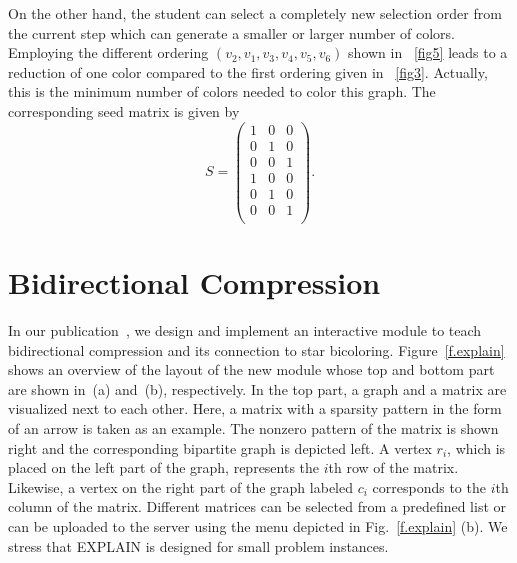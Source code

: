\documentclass[12pt, oneside]{book}
\begin{document}
On the other hand, the student can select a completely new selection order from the current step which can generate a smaller or larger number of colors. Employing the different ordering $(v_2,v_1,v_3,v_4,v_5,v_6)$ shown in \figurename~\ref{fig5} leads to a reduction of one color compared to the first ordering given in \figurename~\ref{fig3}. Actually, this is the minimum number of colors needed to color this graph. The corresponding seed matrix is given by
$$
S =
 \begin{pmatrix}
 1 & 0 & 0 \\
 0 & 1 & 0 \\
 0 & 0 & 1 \\
 1 & 0 & 0 \\
 0 & 1 & 0 \\
 0 & 0 & 1 \\
 \end{pmatrix}.
$$


\section{Bidirectional Compression}
\label{s.bidirectional}
In our publication~\cite{2014:09}, we design and implement an interactive module to
teach bidirectional compression and its connection to star bicoloring.
Figure~\ref{f.explain} shows an overview of the layout of the new module whose top and
bottom part are shown in~(a) and~(b), respectively. In the top part, a graph and a matrix
are visualized next to each other. Here, a matrix with a sparsity pattern in the form of
an arrow is taken as an example. The nonzero pattern of the matrix is shown right and the
corresponding bipartite graph is depicted left. A vertex $r_i$, which is placed on the
left part of the graph, represents the $i$th row of the matrix. Likewise, a vertex on the
right part of the graph labeled $c_i$ corresponds to the $i$th column of the matrix.
Different matrices can be selected from a predefined list or can be uploaded to the
server using the menu depicted in Fig.~\ref{f.explain} (b). We stress that EXPLAIN is
designed for small problem instances.
\end{document}
